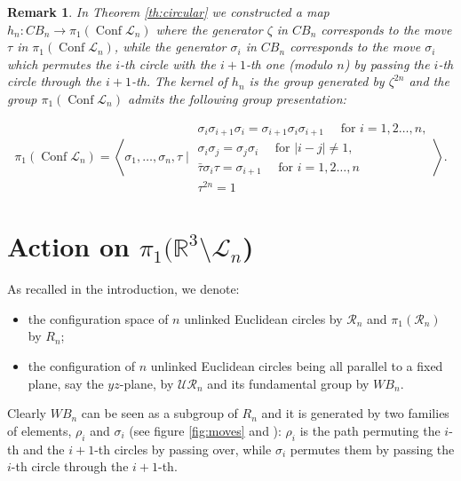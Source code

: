 \documentclass[11pt]{amsart}
\newtheorem{remark}[theorem]{Remark}
\begin{document}
\begin{remark} \label{rk:circular}
 In Theorem  \ref{th:circular}  we constructed a map $h_n: CB_n \to \pi_1({\mathop{\mathrm{Conf}}\nolimits} \mathcal{L}_n)$
where the generator $\zeta$ in $CB_n$ corresponds to  the move $\tau$ in $\pi_1({\mathop{\mathrm{Conf}}\nolimits} \mathcal{L}_n)$,
while   the generator $\sigma_i$ in $CB_n$ corresponds to the move $\sigma_i$ which permutes the $i$-th circle
with the $i+1$-th one (modulo $n$) by passing the $i$-th circle through the $i+1$-th. The kernel of $h_n$ 
is the group generated  by  $\zeta^{2n}$ and the group $\pi_1({\mathop{\mathrm{Conf}}\nolimits} \mathcal{L}_n)$ admits the following 
group presentation:

$$\pi_1({\mathop{\mathrm{Conf}}\nolimits} \mathcal{L}_n) = \left\langle \sigma_1,\ldots,\sigma_n, \tau \mid
\begin{array}{l}
\sigma_i\sigma_{i+1}\sigma_i = \sigma_{i+1}\sigma_i\sigma_{i+1} \quad \text{ for } i = 1,2\ldots, n, \\
\sigma_i\sigma_j=\sigma_j\sigma_i \quad \text{ for } |i-j| \neq 1, \\
{\bar{{\tau}}} \sigma_i \tau =\sigma_{i+1} \quad \text{ for } i = 1,2\ldots, n \\
\tau^{2n}=1
\end{array}
\right\rangle.
$$
\end{remark}

\section{Action on $\pi_1({\mathbb{R}}^3\setminus \mathcal{L}_n$)}
\label{sec:action}

 As recalled in the introduction, we denote:
 \begin{itemize}
 \item  the configuration space 
  of $n$ unlinked Euclidean circles  by $\mathcal{R}_n$ and $\pi_1(\mathcal{R}_n)$ by $R_n$;
\item  the configuration of $n$ unlinked Euclidean circles being all parallel to a fixed plane, say the $yz$-plane,
by $\mathcal{UR}_n$ and  its fundamental group by $WB_n$.
\end{itemize}

Clearly  $WB_n$ can be seen as a subgroup of $R_n$ and it is generated by two families of elements, $\rho_i$ and $\sigma_i$ 
(see figure \ref{fig:moves} and \cite{BH}):  $\rho_i$ is the path permuting the $i$-th and the $i+1$-th circles by passing over,
while $\sigma_i$ permutes them by passing the $i$-th circle through the $i+1$-th.
\end{document}
